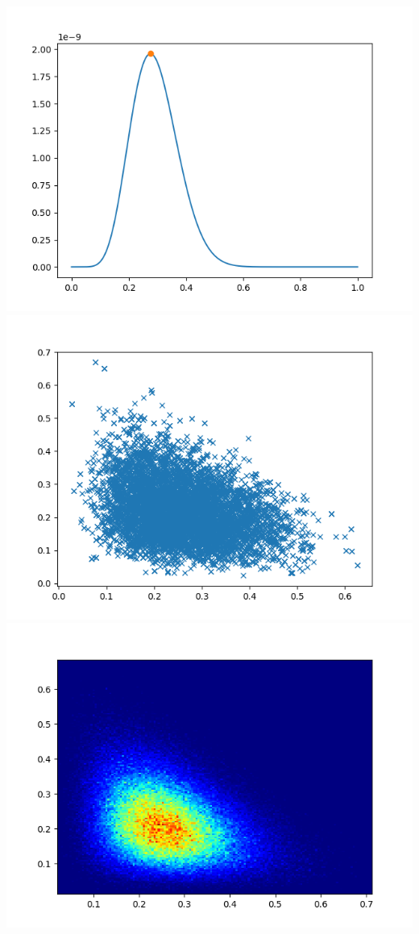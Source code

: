 \documentclass[pt12]{article}
\begin{document}
\newpage

\begin{center}
\includegraphics[scale=0.5]{hip22.png}\\
\includegraphics[scale=0.5]{sc22.png}\\
\includegraphics[scale=0.5]{den22.png}\\
\end{center}
\end{document}

